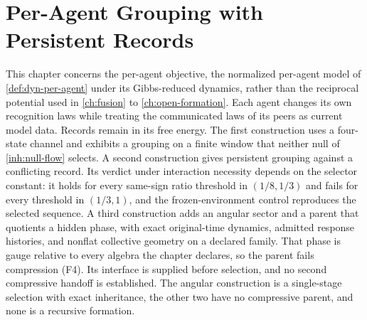 \chapter{Per-Agent Grouping with Persistent Records}
\label{ch:per-agent-inheritance}

This chapter concerns the per-agent objective, the normalized per-agent model of \cref{def:dyn-per-agent} under its Gibbs-reduced dynamics, rather than the reciprocal potential used in \cref{ch:fusion} to \cref{ch:open-formation}. Each agent changes its own recognition laws while treating the communicated laws of its peers as current model data. Records remain in its free energy. The first construction uses a four-state channel and exhibits a grouping on a finite window that neither null of \cref{inh:null-flow} selects. A second construction gives persistent grouping against a conflicting record. Its verdict under interaction necessity depends on the selector constant: it holds for every same-sign ratio threshold in $(1/8,1/3)$ and fails for every threshold in $(1/3,1)$, and the frozen-environment control reproduces the selected sequence. A third construction adds an angular sector and a parent that quotients a hidden phase, with exact original-time dynamics, admitted response histories, and nonflat collective geometry on a declared family. That phase is gauge relative to every algebra the chapter declares, so the parent fails compression (F4). Its interface is supplied before selection, and no second compressive handoff is established. The angular construction is a single-stage selection with exact inheritance, the other two have no compressive parent, and none is a recursive formation.

